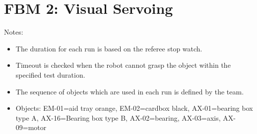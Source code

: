 \section*{FBM 2: Visual Servoing}


\noindent Notes:
\begin{itemize}
\item The duration for each run is based on the referee stop watch.
\item Timeout is checked when the robot cannot grasp the object within the specified test duration.
\item The sequence of objects which are used in each run is defined by the team.
\item Objects: EM-01=aid tray orange, EM-02=cardbox black, AX-01=bearing box type A, AX-16=Bearing box type B, AX-02=bearing, AX-03=axis, AX-09=motor
\end{itemize}

\vspace{0.5cm}


\newpage


